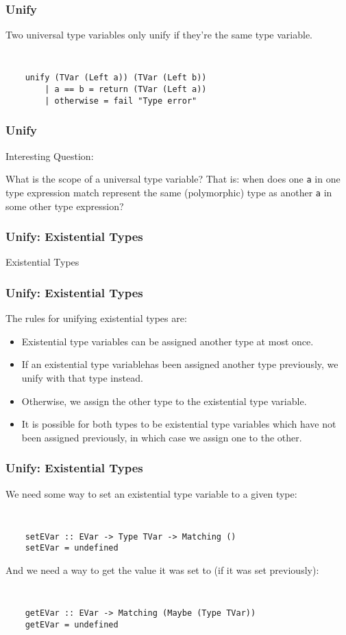 \documentclass{beamer}
\begin{document}
\begin{frame}[fragile]
\frametitle{Unify}
\large{
\begin{center}
Two universal type variables only unify if they're the same type
variable.
\end{center}

{\tt
\begin{verbatim}
    unify (TVar (Left a)) (TVar (Left b))
        | a == b = return (TVar (Left a))
        | otherwise = fail "Type error"
\end{verbatim}
}}
\end{frame}

\begin{frame}
\frametitle{Unify}
\Large{
\begin{center}
Interesting Question:

\vspace{20pt}

What is the scope of a universal type variable?  That is: when does one
{\tt a} in one type expression match represent the same (polymorphic)
type as another {\tt a} in some other type expression?
\end{center}
}
\end{frame}


\begin{frame}
\frametitle{Unify: Existential Types}
\Huge{
\begin{center}
Existential Types
\end{center}
}
\end{frame}

\begin{frame}
\frametitle{Unify: Existential Types}
The rules for unifying existential types are:
\begin{itemize}
\item Existential type variables can be assigned another type \alert{at
most once}.
\item If an existential type variablehas been assigned another type
previously, we unify with that type instead.
\item Otherwise, we assign the other type to the existential type variable.
\item It is possible for both types to be existential type variables
which have not been assigned previously, in which case we assign one
to the other.
\end{itemize}
\end{frame}

\begin{frame}[fragile]
\frametitle{Unify: Existential Types}
\large{
We need some way to set an existential type variable to a given type:
{\tt
\begin{verbatim}
    setEVar :: EVar -> Type TVar -> Matching ()
    setEVar = undefined
\end{verbatim}
}

And we need a way to get the value it was set to (if it was set
previously):

{\tt
\begin{verbatim}
    getEVar :: EVar -> Matching (Maybe (Type TVar))
    getEVar = undefined
\end{verbatim}
}
}
\end{frame}
\end{document}
